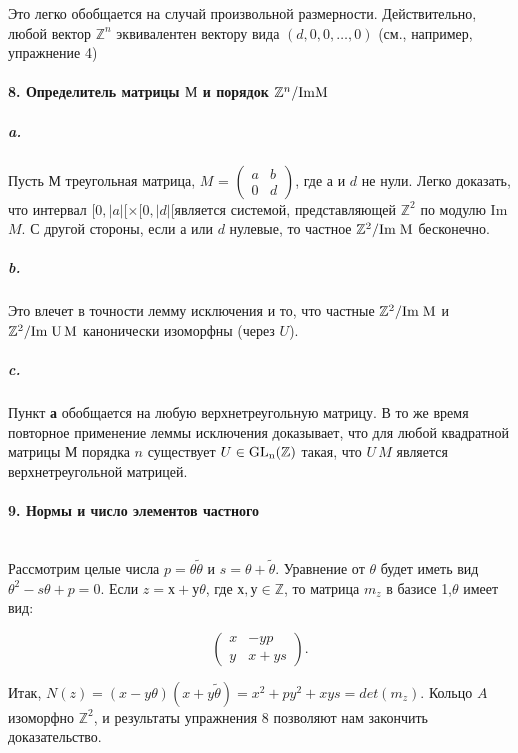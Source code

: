 {Это легко обобщается на случай произвольной размерности. Действительно, любой вектор $\mathbb {Z}^n$ эквивалентен вектору вида $(d,0,0,\ldots,0)$ (см., например, упражнение 4)

\paragraph{8. Определитель матрицы $М$ и порядок $\mathbb {Z}^{n}/{\rm{Im}{M}}$}

\subparagraph{a.} Пусть $М$ треугольная матрица, $M$ = $\begin{pmatrix} a & b \\ 0 & d \end{pmatrix}$, где $а$ и $d$ не нули. Легко доказать, что интервал $[0,|a|[\times[0,|d|$[является системой, представляющей $\mathbb {Z}^2$ по модулю Im{$M$}. С другой стороны, если $а$ или $d$ нулевые, то частное $\mathbb {Z}^2/\rm{Im\;{M}}$ бесконечно. \subparagraph{b.} Это влечет в точности лемму исключения и то, что частные $\mathbb {Z}^2/\rm{Im\;{M}}$ и $\mathbb {Z}^2/\rm{Im\;{U\,M}}$ канонически изоморфны (через $U$).

\subparagraph{c.} Пункт {\bf а} обобщается на любую верхнетреугольную матрицу. В то же время повторное применение леммы исключения доказывает, что для любой квадратной матрицы $М$ порядка $n$ существует $U \in \rm{GL_{n}}(\mathbb {Z})$ такая, что $U\,M$ является верхнетреугольной матрицей.

\paragraph{9. Нормы и число элементов частного} \mbox{}\\

Рассмотрим целые числа $p = \theta\tilde{\theta}$ и $s = \theta + \tilde{\theta}$. Уравнение от $\theta$ будет иметь вид $\theta^{2} - s\theta + p = 0$. Если $z = х + у\theta$, где $х,у \in \mathbb {Z}$, то матрица $m_{z}$ в базисе {1,$\theta$} имеет вид:

\begin{equation*}
\begin{pmatrix} x & -yp \\ y & x + ys \end{pmatrix}.
\end{equation*}

\noindent Итак, $N(z) = (x - y{\theta})(x + y\tilde{\theta}) = x^2 + py^2 + xys = det(m_{z})$. Кольцо $A$ изоморфно $\mathbb {Z}^2$, и результаты упражнения 8 позволяют нам закончить доказательство.



}
